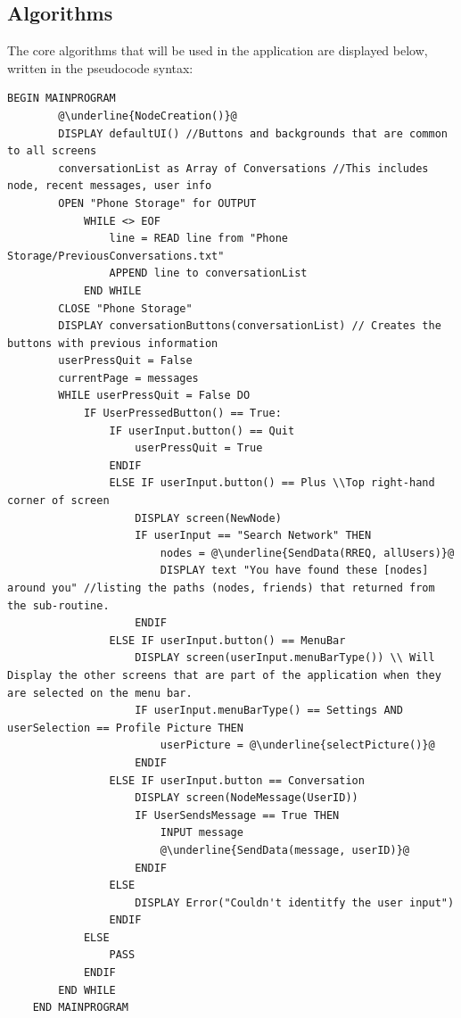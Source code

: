 \documentclass[a4paper, titlepage]{article}
\begin{document}
\subsection{Algorithms}

\renewcommand{\ttdefault}{pcr}

The core algorithms that will be used in the application are displayed below, written in the pseudocode syntax:

\begin{lstlisting}[caption=Main Program, escapechar=\@]
	BEGIN MAINPROGRAM
		@\underline{NodeCreation()}@
		DISPLAY defaultUI() //Buttons and backgrounds that are common to all screens
		conversationList as Array of Conversations //This includes node, recent messages, user info
		OPEN "Phone Storage" for OUTPUT
			WHILE <> EOF
				line = READ line from "Phone Storage/PreviousConversations.txt"
				APPEND line to conversationList
			END WHILE
		CLOSE "Phone Storage"
		DISPLAY conversationButtons(conversationList) // Creates the buttons with previous information		
		userPressQuit = False 
		currentPage = messages
		WHILE userPressQuit = False DO
			IF UserPressedButton() == True:
				IF userInput.button() == Quit
					userPressQuit = True
				ENDIF
				ELSE IF userInput.button() == Plus \\Top right-hand corner of screen
					DISPLAY screen(NewNode)
					IF userInput == "Search Network" THEN
						nodes = @\underline{SendData(RREQ, allUsers)}@
						DISPLAY text "You have found these [nodes] around you" //listing the paths (nodes, friends) that returned from the sub-routine.	
					ENDIF
				ELSE IF userInput.button() == MenuBar
					DISPLAY screen(userInput.menuBarType()) \\ Will Display the other screens that are part of the application when they are selected on the menu bar.
					IF userInput.menuBarType() == Settings AND userSelection == Profile Picture THEN
						userPicture = @\underline{selectPicture()}@
					ENDIF
				ELSE IF userInput.button == Conversation
					DISPLAY screen(NodeMessage(UserID))
					IF UserSendsMessage == True THEN
						INPUT message
						@\underline{SendData(message, userID)}@
					ENDIF
				ELSE
					DISPLAY Error("Couldn't identitfy the user input")
				ENDIF
			ELSE
				PASS
			ENDIF
		END WHILE			
	END MAINPROGRAM
\end{lstlisting}
\end{document}
